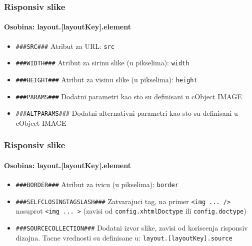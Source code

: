 
\begin{frame}[fragile]
	\frametitle{Risponsiv slike}
	\framesubtitle{Osobina: layout.[layoutKey].element}

	\begin{itemize}
		\item \lstinline!###SRC###!\newline
			Atribut za URL: \texttt{src}

		\item \lstinline!###WIDTH###!\newline
			Atribut za sirinu slike (u pikselima): \texttt{width}

		\item \lstinline!###HEIGHT###!\newline
			Atribut za visinu slike (u pikselima): \texttt{height}

		\item \lstinline!###PARAMS###!\newline
			Dodatni parametri kao sto su definisani u cObject IMAGE

		\item \lstinline!###ALTPARAMS###!\newline
			Dodatni alternativni parametri kao sto su definisani u cObject IMAGE
	\end{itemize}

\end{frame}


\begin{frame}[fragile]
	\frametitle{Risponsiv slike}
	\framesubtitle{Osobina: layout.[layoutKey].element}

	\begin{itemize}
		\item \lstinline!###BORDER###!\newline
			Atribut za ivicu (u pikselima): \texttt{border}

		\item \lstinline!###SELFCLOSINGTAGSLASH###!\newline
			Zatvarajuci tag, na primer \texttt{<img ... />} nasuprot \texttt{<img ... >}\newline
			(zavisi od \texttt{config.xhtmlDoctype} ili \texttt{config.doctype})

		\item \lstinline!###SOURCECOLLECTION###!\newline
			Dodatni izvor slike, zavisi od koriscenja risponsiv dizajna.
			Tacne vrednosti su definisane u: \texttt{layout.[layoutKey].source}
	\end{itemize}

\end{frame}

